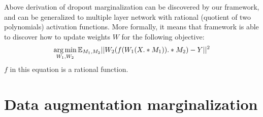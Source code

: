 Above derivation of dropout marginalization can be discovered by our framework, and can be generalized
to multiple layer network with rational (quotient of two polynomials) activation functions. 
More formally, it means that framework is able to discover how to update weights $W$ for the following
objective:
\begin{equation*}
  \operatorname*{arg\,min}_{W_1, W_2} \mathbb{E}_{M_1, M_2} ||W_2(f(W_1(X .* M_1)) .* M_2) - Y||^2
\end{equation*}
$f$ in this equation is a rational function.


\section{Data augmentation marginalization}
